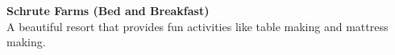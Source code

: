 {\textbf{Schrute Farms (Bed and Breakfast)}}\\
A beautiful resort that provides fun activities like table making and mattress making.\\
\vspace*{2mm}